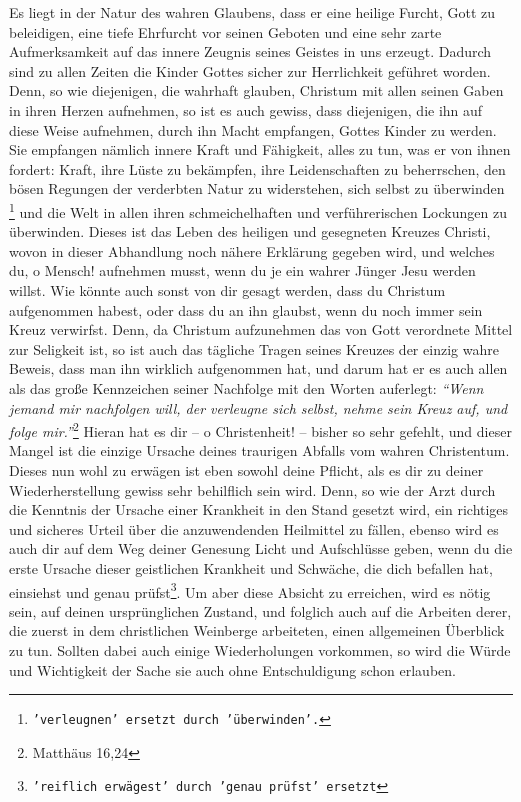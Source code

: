 Es liegt in der Natur des wahren Glaubens, dass er eine heilige Furcht, Gott zu
beleidigen, eine tiefe Ehrfurcht vor seinen Geboten und eine sehr zarte
Aufmerksamkeit auf das innere Zeugnis seines Geistes in uns erzeugt. Dadurch
sind zu allen Zeiten die Kinder Gottes sicher zur Herrlichkeit geführet worden.
Denn, so wie diejenigen, die wahrhaft glauben, Christum mit allen seinen Gaben
in ihren Herzen aufnehmen, so ist es auch gewiss, dass diejenigen, die ihn auf
diese Weise aufnehmen, durch ihn Macht empfangen, Gottes Kinder zu werden. Sie
empfangen nämlich innere Kraft und Fähigkeit, alles zu tun, was er von ihnen
fordert: Kraft, ihre Lüste zu bekämpfen, ihre Leidenschaften zu beherrschen, den
bösen Regungen der verderbten Natur zu widerstehen, sich selbst zu überwinden
\footnote{\texttt{'verleugnen' ersetzt durch 'überwinden'.}}
und die Welt in allen ihren schmeichelhaften und verführerischen Lockungen zu
überwinden. Dieses ist das Leben des heiligen und gesegneten Kreuzes Christi,
wovon in dieser Abhandlung noch nähere Erklärung gegeben wird, und welches du, o
Mensch! aufnehmen musst, wenn du je ein wahrer Jünger Jesu werden willst. Wie
könnte auch sonst von dir gesagt werden, dass du Christum aufgenommen habest,
oder dass du an ihn glaubst, wenn du noch immer sein Kreuz verwirfst. Denn, da
Christum aufzunehmen das von Gott verordnete Mittel zur Seligkeit ist, so ist
auch das tägliche Tragen seines Kreuzes der einzig wahre Beweis, dass man ihn
wirklich aufgenommen hat, und darum hat er es auch allen als das große
Kennzeichen seiner Nachfolge mit den Worten auferlegt:
\textit{"`Wenn jemand mir nachfolgen will, der verleugne sich selbst, nehme sein
Kreuz auf, und folge mir."'}\footnote{Matthäus 16,24}
Hieran hat es dir -- o Christenheit! -- bisher so sehr gefehlt, und dieser
Mangel ist die einzige Ursache deines traurigen Abfalls vom wahren Christentum.
Dieses
nun wohl zu erwägen ist eben sowohl deine Pflicht, als es dir zu deiner
Wiederherstellung gewiss sehr behilflich sein wird. Denn, so wie der Arzt durch
die Kenntnis der Ursache einer Krankheit in den Stand gesetzt wird, ein
richtiges und sicheres Urteil über die anzuwendenden Heilmittel zu fällen,
ebenso
wird es auch dir auf dem Weg deiner Genesung Licht und Aufschlüsse geben,
wenn du die erste Ursache dieser geistlichen Krankheit und Schwäche, die dich
befallen hat, einsiehst und genau prüfst\footnote{\texttt{'reiflich erwägest'
durch 'genau prüfst' ersetzt}}.
Um aber diese Absicht zu
erreichen, wird es nötig sein, auf deinen ursprünglichen Zustand, und folglich
auch auf die Arbeiten derer, die zuerst in dem christlichen Weinberge
arbeiteten, einen allgemeinen Überblick zu tun. Sollten dabei auch einige
Wiederholungen vorkommen, so wird die Würde und Wichtigkeit der Sache sie auch
ohne Entschuldigung schon erlauben.

